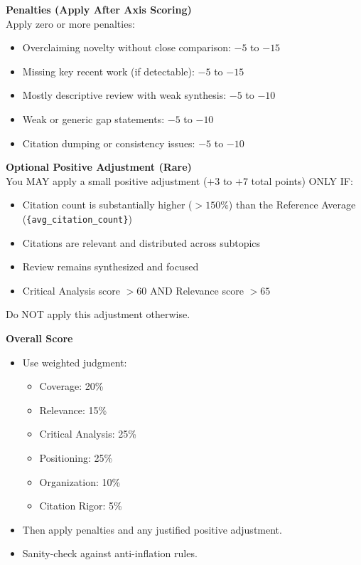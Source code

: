 \vspace{1em}
\noindent\textbf{Penalties (Apply After Axis Scoring)}\\
\vspace{0.5em}
Apply zero or more penalties:
\begin{itemize}
    \item Overclaiming novelty without close comparison: $-5$ to $-15$
    \item Missing key recent work (if detectable): $-5$ to $-15$
    \item Mostly descriptive review with weak synthesis: $-5$ to $-10$
    \item Weak or generic gap statements: $-5$ to $-10$
    \item Citation dumping or consistency issues: $-5$ to $-10$
\end{itemize}

\vspace{1em}
\noindent\textbf{Optional Positive Adjustment (Rare)}\\
\vspace{0.5em}
You MAY apply a small positive adjustment ($+3$ to $+7$ total points) ONLY IF:
\begin{itemize}
    \item Citation count is substantially higher ($>150\%$) than the Reference Average (\texttt{\{avg\_citation\_count\}})
    \item Citations are relevant and distributed across subtopics
    \item Review remains synthesized and focused
    \item Critical Analysis score $>60$ AND Relevance score $>65$
\end{itemize}
Do NOT apply this adjustment otherwise.

\vspace{1em}
\noindent\textbf{Overall Score}
\begin{itemize}
    \item Use weighted judgment:
    \begin{itemize}
        \item Coverage: 20\%
        \item Relevance: 15\%
        \item Critical Analysis: 25\%
        \item Positioning: 25\%
        \item Organization: 10\%
        \item Citation Rigor: 5\%
    \end{itemize}
    \item Then apply penalties and any justified positive adjustment.
    \item Sanity-check against anti-inflation rules.
\end{itemize}


